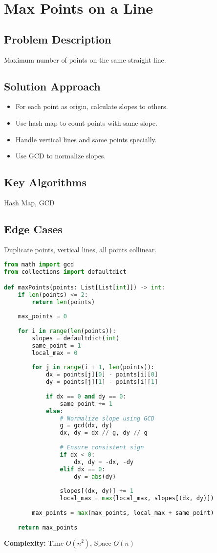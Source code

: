 \documentclass[10pt, a4paper]{article}
\begin{document}
\section{Max Points on a Line}
\subsection*{Problem Description}
Maximum number of points on the same straight line.

\subsection*{Solution Approach}
\begin{itemize}
    \item For each point as origin, calculate slopes to others.
    \item Use hash map to count points with same slope.
    \item Handle vertical lines and same points specially.
    \item Use GCD to normalize slopes.
\end{itemize}

\subsection*{Key Algorithms}
Hash Map, GCD

\subsection*{Edge Cases}
Duplicate points, vertical lines, all points collinear.

\begin{lstlisting}[language=Python]
from math import gcd
from collections import defaultdict

def maxPoints(points: List[List[int]]) -> int:
    if len(points) <= 2:
        return len(points)
    
    max_points = 0
    
    for i in range(len(points)):
        slopes = defaultdict(int)
        same_point = 1
        local_max = 0
        
        for j in range(i + 1, len(points)):
            dx = points[j][0] - points[i][0]
            dy = points[j][1] - points[i][1]
            
            if dx == 0 and dy == 0:
                same_point += 1
            else:
                # Normalize slope using GCD
                g = gcd(dx, dy)
                dx, dy = dx // g, dy // g
                
                # Ensure consistent sign
                if dx < 0:
                    dx, dy = -dx, -dy
                elif dx == 0:
                    dy = abs(dy)
                
                slopes[(dx, dy)] += 1
                local_max = max(local_max, slopes[(dx, dy)])
        
        max_points = max(max_points, local_max + same_point)
    
    return max_points
\end{lstlisting}
\textbf{Complexity:} Time $O(n^2)$, Space $O(n)$
\end{document}

